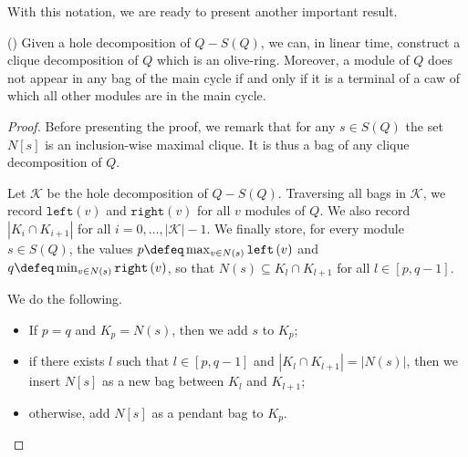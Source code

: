 \documentclass{article}
\begin{document}
    With this notation, we are
    ready to present another
    important result.

    \begin{lemma} (\cite{main}) \label{or_2}
        Given a hole decomposition
        of $Q - S\left(Q\right)$,
        we can, in linear time,
        construct a clique decomposition
        of $Q$ which is an olive-ring.
        Moreover, a module of $Q$ 
        does not appear in any
        bag of the main cycle
        if and only if it is
        a terminal of a caw
        of which all other modules are in
        the main cycle.
    \end{lemma}
    \begin{proof}
        Before presenting the proof, 
        we remark that for any $s \in S\left(Q\right)$ 
        the set $N\left[s\right]$ 
        is an inclusion-wise maximal
        clique. It is thus a bag
        of any clique decomposition of $Q$.

        Let $\mathcal{K}$ be the
        hole decomposition of $Q - S\left(Q\right)$.
        Traversing all bags in $\mathcal{K}$,
        we record $\texttt{left}\left(v\right)$ 
        and $\texttt{right}\left(v\right)$ 
        for all $v$ modules of $Q$.
        We also record $\left|K_{i} \cap K_{i+1}\right|$
        for all $i = 0, \ldots, \left|\mathcal{K}\right|-1$.
        We finally store, for every 
        module $s \in S\left(Q\right)$,
        the values $p \defeq \max_{v \in N\left(s\right)} \texttt{left}\left(v\right)$ 
        and $q \defeq \min_{v \in N\left(s\right)} \texttt{right}\left(v\right)$,
        so that $N\left(s\right) \subseteq K_{l} \cap K_{l+1}$ 
        for all $l \in \left[p, q-1\right]$.

        We do the following.
        \begin{itemize}
            \item If $p = q$ and $K_{p} = N\left(s\right)$,
                then we add $s$ to $K_{p}$;
            \item if there exists $l$ 
                such that $l \in \left[p, q-1\right]$ 
                and $\left|K_{l} \cap K_{l+1}\right| = \left|N\left(s\right)\right|$,
                then we insert $N\left[s\right]$
                as a new bag between $K_{l}$ 
                and $K_{l+1}$;
            \item otherwise, add $N\left[s\right]$ 
                as a pendant bag to $K_{p}$.
        \end{itemize}


\end{proof}
\end{document}
